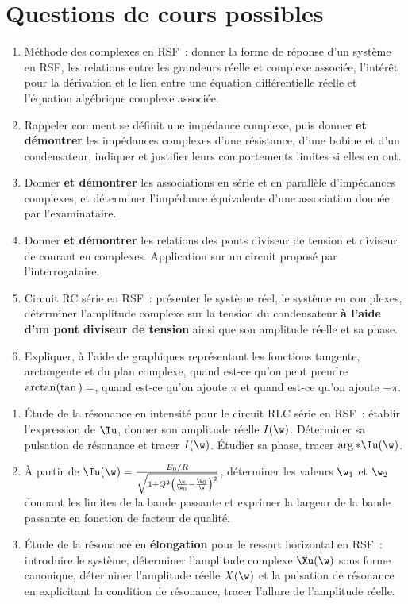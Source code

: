 \documentclass[a4paper, 12pt, final, garamond]{book}
\begin{document}
\section{Questions de cours possibles}
\begin{enumerate}
	\item Méthode des complexes en RSF~: donner la forme de réponse d'un système
	      en RSF, les relations entre les grandeurs réelle et complexe associée,
	      l'intérêt pour la dérivation et le lien entre une équation
	      différentielle réelle et l'équation algébrique complexe associée.
	\item Rappeler comment se définit une impédance complexe, puis donner
	      \textbf{et démontrer} les impédances complexes d'une résistance, d'une
	      bobine et d'un condensateur, indiquer et justifier leurs comportements
	      limites si elles en ont.
	\item Donner \textbf{et démontrer} les associations en série et en parallèle
	      d'impédances complexes, et déterminer l'impédance équivalente d'une
	      association donnée par l'examinataire.
	\item Donner \textbf{et démontrer} les relations des ponts diviseur de tension
	      et diviseur de courant en complexes. Application sur un circuit proposé
	      par l'interrogataire.
	\item Circuit RC série en RSF~: présenter le système réel, le système en
	      complexes, déterminer l'amplitude complexe sur la tension du
	      condensateur \textbf{à l'aide d'un pont diviseur de tension} ainsi que
	      son amplitude réelle et sa phase.
	\item Expliquer, à l'aide de graphiques représentant les fonctions tangente,
	      arctangente et du plan complexe, quand est-ce qu'on peut prendre
	      $\arctan(\tan{\tt}) = \tt$, quand est-ce qu'on ajoute $\pi$ et quand est-ce
	      qu'on ajoute $-\pi$.
\end{enumerate}

\begin{enumerate}[resume]
	\item Étude de la résonance en intensité pour le circuit RLC série en RSF~:
	      établir l'expression de $\Iu$, donner son amplitude réelle $I(\w)$.
	      Déterminer sa pulsation de résonance et tracer $I(\w)$. Étudier sa
	      phase, tracer $\arg*{\Iu(\w)}$.
	\item À partir de $\Iu(\w) =
		      \frac{E_0/R}{\sqrt{1 + Q^2\left( \frac{\w}{\w_0} - \frac{\w_0}{\w}
				      \right)^2}}$, déterminer les valeurs $\w_1$ et $\w_2$ donnant
	      les limites de la bande passante et exprimer la largeur de la
	      bande passante en fonction de facteur de qualité.
	\item Étude de la résonance en \textbf{élongation} pour le ressort
	      horizontal en RSF~: introduire le système, déterminer l'amplitude
	      complexe $\Xu(\w)$ sous forme canonique, déterminer l'amplitude réelle
	      $X(\w)$ et la pulsation de résonance en explicitant la condition de
	      résonance, tracer l'allure de l'amplitude réelle.
\end{enumerate}
\end{document}
